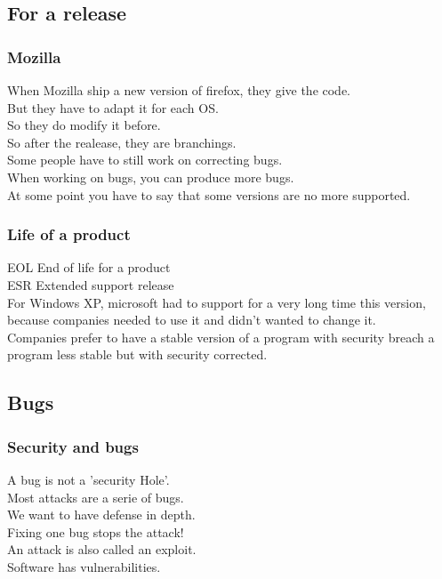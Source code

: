 \documentclass[a4paper,11pt]{article}
\begin{document}
\subsection{For a release}

\subsubsection{Mozilla }
When Mozilla ship a new version of firefox, they give the code.\\
But they have to adapt it for each OS.\\
So they do modify it before.\\

So after the realease, they are branchings.\\
Some people have to still work on correcting bugs.\\

When working on bugs, you can produce more bugs.\\

At some point you have to say that some versions are no more supported.\\

\subsubsection{Life of a product}
EOL End of life for a product\\
ESR Extended support release\\

For Windows XP, microsoft had to support for a very long time this version, because companies needed to use it and didn't wanted to change it.\\

Companies prefer to have a stable version of a program with security breach a program less stable but with security corrected.\\


\subsection{Bugs}
\subsubsection{Security and bugs}

A bug is not a 'security Hole'.\\
Most attacks are a serie of bugs.\\
We want to have defense in depth.\\
Fixing one bug stops the attack!\\
An attack is also called an exploit.\\
Software has vulnerabilities.\\
\end{document}
